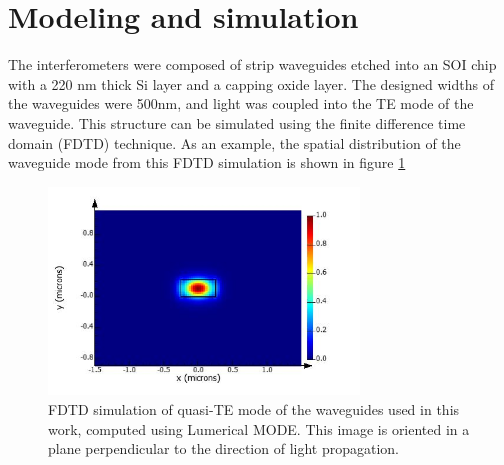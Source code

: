 \documentclass[journal]{IEEEtran}
\begin{document}

%
%

\section{Modeling and simulation}
\label{sec:model}


The interferometers were composed of strip waveguides etched into an SOI chip with a 220 nm thick Si layer and a capping oxide layer. The designed widths of the waveguides were 500nm, and light was coupled into the TE mode of the waveguide. This structure can be simulated using the finite difference time domain (FDTD) technique. As an example, the spatial distribution of the waveguide mode from this FDTD simulation is shown in figure \ref{fig:mode}

\begin{figure}[t!]
  \centering
  \includegraphics[width = 3.25in]{fig/waveguide_TE.jpg}
  \caption{FDTD simulation of quasi-TE mode of the waveguides used in this work, computed using Lumerical MODE. This image is oriented in a plane perpendicular to the direction of light propagation.}
  \label{fig:mode}
\end{figure}
\end{document}
